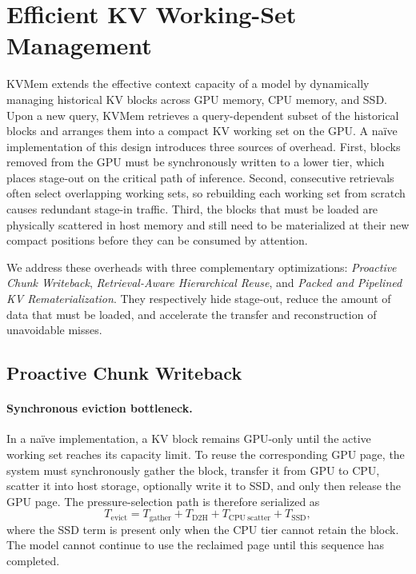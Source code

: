 \section{Efficient KV Working-Set Management}
\label{sec:efficient-kv-working-set-management}

KVMem extends the effective context capacity of a model by dynamically
managing historical KV blocks across GPU memory, CPU memory, and SSD.  Upon a
new query, KVMem retrieves a query-dependent subset of the historical blocks
and arranges them into a compact KV working set on the GPU.  A na\"ive
implementation of this design introduces three sources of overhead.  First,
blocks removed from the GPU must be synchronously written to a lower tier,
which places stage-out on the critical path of inference.  Second, consecutive
retrievals often select overlapping working sets, so rebuilding each working
set from scratch causes redundant stage-in traffic.  Third, the blocks that
must be loaded are physically scattered in host memory and still need to be
materialized at their new compact positions before they can be consumed by
attention.

We address these overheads with three complementary optimizations:
\emph{Proactive Chunk Writeback}, \emph{Retrieval-Aware Hierarchical Reuse},
and \emph{Packed and Pipelined KV Rematerialization}.  They respectively hide
stage-out, reduce the amount of data that must be loaded, and accelerate the
transfer and reconstruction of unavoidable misses.

\subsection{Proactive Chunk Writeback}
\label{sec:proactive-chunk-writeback}

\paragraph{Synchronous eviction bottleneck.}
In a na\"ive implementation, a KV block remains GPU-only until the active
working set reaches its capacity limit.  To reuse the corresponding GPU page,
the system must synchronously gather the block, transfer it from GPU to CPU,
scatter it into host storage, optionally write it to SSD, and only then release
the GPU page.  The pressure-selection path is therefore serialized as
\begin{equation}
  T_{\mathrm{evict}} =
  T_{\mathrm{gather}} +
  T_{\mathrm{D2H}} +
  T_{\mathrm{CPU\ scatter}} +
  T_{\mathrm{SSD}},
  \label{eq:synchronous-eviction}
\end{equation}
where the SSD term is present only when the CPU tier cannot retain the block.
The model cannot continue to use the reclaimed page until this sequence has
completed.

